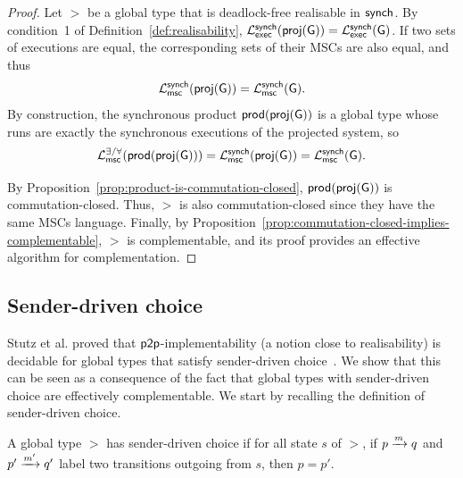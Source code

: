 \begin{proof}
    Let $\gt$ be a global type that is  deadlock-free realisable in $\synchmodel$.
    By condition~1 of Definition~\ref{def:realisability}, 
    $\executionsof{\projectionof{\gt}}{\synchmodel} = \executionsof{\gt}{\synchmodel}$.
    If two sets of executions are equal, the corresponding sets of their MSCs are also equal, 
    and thus $$\msclanguageof{\projectionof{\gt}}{\synchmodel}=\msclanguageof{\gt}{\synchmodel}.$$
    By construction, the synchronous product $\productof{\projectionof{\gt}}$
    is a global type whose runs are exactly the synchronous executions of the projected system, so 
    $$\msclanguageofcc{\productof{\projectionof{\gt}}}=\msclanguageof{\projectionof{\gt}}{\synchmodel}=\msclanguageof{\gt}{\synchmodel}.$$

    By Proposition~\ref{prop:product-is-commutation-closed}, $\productof{\projectionof{\gt}}$ is commutation-closed. 
    Thus, $\gt$ is also commutation-closed since they have the same MSCs language.
    Finally, by Proposition~\ref{prop:commutation-closed-implies-complementable},
    $\gt$ is complementable, and its proof  
    provides an effective algorithm for  complementation.
\end{proof}
    
\subsection{Sender-driven choice}

Stutz et al.  proved that $\ppmodel$-implementability (a notion close to realisability) 
is decidable for global types that satisfy sender-driven choice~\cite{DBLP:conf/cav/LiSWZ23}. We show that this can be seen as a consequence of the fact that global types with sender-driven choice are effectively complementable. We start by  recalling the definition of sender-driven choice.

\begin{definition}
    A global type $\gt$ has sender-driven choice
    if for all state $s$ of $\gt$, if $\gtlabel{p}{q}{m}$ and
    $\gtlabel{p'}{q'}{m'}$ label two transitions outgoing from $s$,
    then $p=p'$.
\end{definition}



